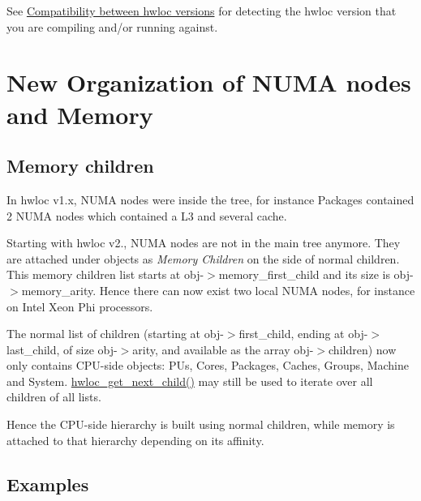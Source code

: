 

See \hyperlink{a00394_faq5}{Compatibility between hwloc versions} for detecting the hwloc version that you are compiling and/or running against.

 \hypertarget{a00395_upgrade_to_api_2x_memory}{}\section{New Organization of N\+U\+M\+A nodes and Memory}\label{a00395_upgrade_to_api_2x_memory}
\hypertarget{a00395_upgrade_to_api_2x_memory_children}{}\subsection{Memory children}\label{a00395_upgrade_to_api_2x_memory_children}
In hwloc v1.\+x, N\+U\+MA nodes were inside the tree, for instance Packages contained 2 N\+U\+MA nodes which contained a L3 and several cache.

Starting with hwloc v2., N\+U\+MA nodes are not in the main tree anymore. They are attached under objects as {\itshape Memory Children} on the side of normal children. This memory children list starts at {\ttfamily obj-\/$>$memory\+\_\+first\+\_\+child} and its size is {\ttfamily obj-\/$>$memory\+\_\+arity}. Hence there can now exist two local N\+U\+MA nodes, for instance on Intel Xeon Phi processors.

The normal list of children (starting at {\ttfamily obj-\/$>$first\+\_\+child}, ending at {\ttfamily obj-\/$>$last\+\_\+child}, of size {\ttfamily obj-\/$>$arity}, and available as the array {\ttfamily obj-\/$>$children}) now only contains C\+P\+U-\/side objects\+: P\+Us, Cores, Packages, Caches, Groups, Machine and System. \hyperlink{a00197_ga12d8565a3436c565e791ed02a0353621}{hwloc\+\_\+get\+\_\+next\+\_\+child()} may still be used to iterate over all children of all lists.

Hence the C\+P\+U-\/side hierarchy is built using normal children, while memory is attached to that hierarchy depending on its affinity.\hypertarget{a00395_upgrade_to_api_2x_memory_examples}{}\subsection{Examples}\label{a00395_upgrade_to_api_2x_memory_examples}

